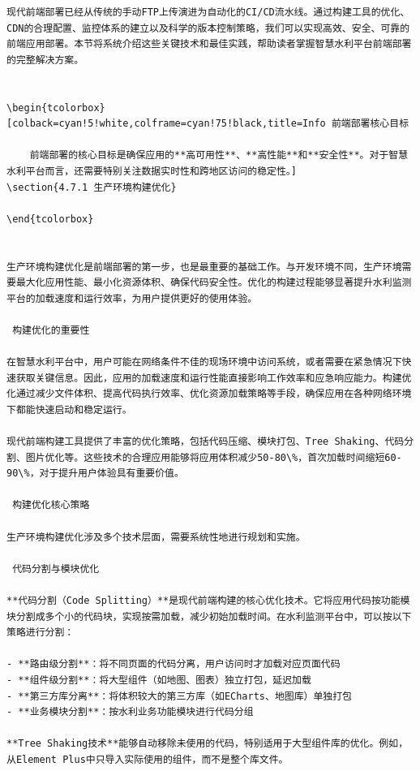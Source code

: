 {{\begin{lstlisting}
现代前端部署已经从传统的手动FTP上传演进为自动化的CI/CD流水线。通过构建工具的优化、CDN的合理配置、监控体系的建立以及科学的版本控制策略，我们可以实现高效、安全、可靠的前端应用部署。本节将系统介绍这些关键技术和最佳实践，帮助读者掌握智慧水利平台前端部署的完整解决方案。


\begin{tcolorbox}[colback=cyan!5!white,colframe=cyan!75!black,title=Info 前端部署核心目标
    
    前端部署的核心目标是确保应用的**高可用性**、**高性能**和**安全性**。对于智慧水利平台而言，还需要特别关注数据实时性和跨地区访问的稳定性。]
\section{4.7.1 生产环境构建优化}

\end{tcolorbox}


生产环境构建优化是前端部署的第一步，也是最重要的基础工作。与开发环境不同，生产环境需要最大化应用性能、最小化资源体积、确保代码安全性。优化的构建过程能够显著提升水利监测平台的加载速度和运行效率，为用户提供更好的使用体验。

 构建优化的重要性

在智慧水利平台中，用户可能在网络条件不佳的现场环境中访问系统，或者需要在紧急情况下快速获取关键信息。因此，应用的加载速度和运行性能直接影响工作效率和应急响应能力。构建优化通过减少文件体积、提高代码执行效率、优化资源加载策略等手段，确保应用在各种网络环境下都能快速启动和稳定运行。

现代前端构建工具提供了丰富的优化策略，包括代码压缩、模块打包、Tree Shaking、代码分割、图片优化等。这些技术的合理应用能够将应用体积减少50-80\%，首次加载时间缩短60-90\%，对于提升用户体验具有重要价值。

 构建优化核心策略

生产环境构建优化涉及多个技术层面，需要系统性地进行规划和实施。

 代码分割与模块优化

**代码分割（Code Splitting）**是现代前端构建的核心优化技术。它将应用代码按功能模块分割成多个小的代码块，实现按需加载，减少初始加载时间。在水利监测平台中，可以按以下策略进行分割：

- **路由级分割**：将不同页面的代码分离，用户访问时才加载对应页面代码
- **组件级分割**：将大型组件（如地图、图表）独立打包，延迟加载
- **第三方库分离**：将体积较大的第三方库（如ECharts、地图库）单独打包
- **业务模块分割**：按水利业务功能模块进行代码分组

**Tree Shaking技术**能够自动移除未使用的代码，特别适用于大型组件库的优化。例如，从Element Plus中只导入实际使用的组件，而不是整个库文件。


\end{lstlisting}}}
